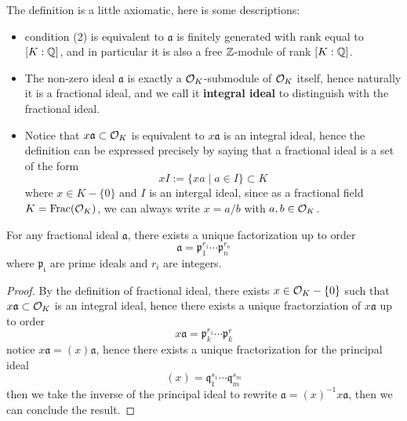 \begin{remark}
    The definition is a little axiomatic, here is some descriptions:
    \begin{itemize}
        \item condition (2) is equivalent to \(\mathfrak{a}\) is finitely generated with rank equal to \([K:\mathbb{Q}]\), and in particular it is also a free \(\mathbb{Z}\)-module of rank \([K:\mathbb{Q}]\).
        \item  The non-zero ideal \(\mathfrak{a}\) is exactly a \(\mathcal{O}_K\)-submodule of \(\mathcal{O}_K\) itself, hence naturally it is a fractional ideal, and we call it \textbf{integral ideal} to distinguish with the fractional ideal.
        \item Notice that \(x\mathfrak{a} \subset \mathcal{O}_K\) is equivalent to \(x\mathfrak{a}\) is an integral ideal, hence the definition can be expressed precisely by saying that a fractional ideal is a set of the form
        \[xI := \{xa \mid a \in I\} \subset K\] 
        where \(x \in K-\{0\}\) and \(I\) is an intergal ideal, since as a fractional field \(K = \mathrm{Frac}(\mathcal{O}_K)\), we can always write \(x = a/b\) with \(a,b \in \mathcal{O}_K\).

    \end{itemize}
\end{remark}


\begin{colorlemma}
    For any fractional ideal \(\mathfrak{a}\), there exists a unique factorization up to order \[\mathfrak{a} = \mathfrak{p}_1^{r_1} \cdots \mathfrak{p}_n^{r_n}\]
    where \(\mathfrak{p_i}\) are prime ideals and \(r_i\) are integers.
\end{colorlemma}

\begin{proof}
    By the definition of fractional ideal, there exists \(x \in \mathcal{O}_K-\{0\}\) such that \(x\mathfrak{a} \subset \mathcal{O}_K\) is an integral ideal, hence there exists a unique fractorziation of \(x\mathfrak{a}\) up to order
    \[x\mathfrak{a} = \mathfrak{p}_k^{r_1} \cdots \mathfrak{p}_k^{r}\]
    notice \(x\mathfrak{a} = (x) \mathfrak{a}\), hence there exists a unique fractorization for the principal ideal
    \[(x) = \mathfrak{q}_1^{s_1} \cdots \mathfrak{q}_m^{s_m}\]
    then we take the inverse of the principal ideal to rewrite \(\mathfrak{a} = (x)^{-1} x\mathfrak{a}\), then we can conclude the result.
\end{proof}

